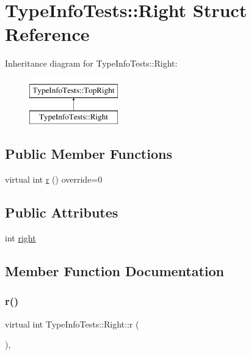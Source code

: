 \hypertarget{structTypeInfoTests_1_1Right}{}\section{Type\+Info\+Tests\+::Right Struct Reference}
\label{structTypeInfoTests_1_1Right}
Inheritance diagram for Type\+Info\+Tests\+::Right\+:\begin{figure}[H]
\begin{center}
\leavevmode
\includegraphics[height=2.000000cm]{structTypeInfoTests_1_1Right}
\end{center}
\end{figure}
\subsection*{Public Member Functions}
\begin{DoxyCompactItemize}
\item 
virtual int \mbox{\hyperlink{structTypeInfoTests_1_1Right_a7f3f464a9db9ae53e3b5dec2ef33ede4}{r}} () override=0
\end{DoxyCompactItemize}
\subsection*{Public Attributes}
\begin{DoxyCompactItemize}
\item 
int \mbox{\hyperlink{structTypeInfoTests_1_1Right_ae7131ff36583a96aa05057b833c995a0}{right}}
\end{DoxyCompactItemize}


\subsection{Member Function Documentation}
\mbox{\label{structTypeInfoTests_1_1Right_a7f3f464a9db9ae53e3b5dec2ef33ede4}} 
\subsubsection{\texorpdfstring{r()}{r()}}
{\footnotesize\ttfamily virtual int Type\+Info\+Tests\+::\+Right\+::r (\begin{DoxyParamCaption}{ }\end{DoxyParamCaption})\hspace{0.3cm}{\ttfamily [override]}, {}}



